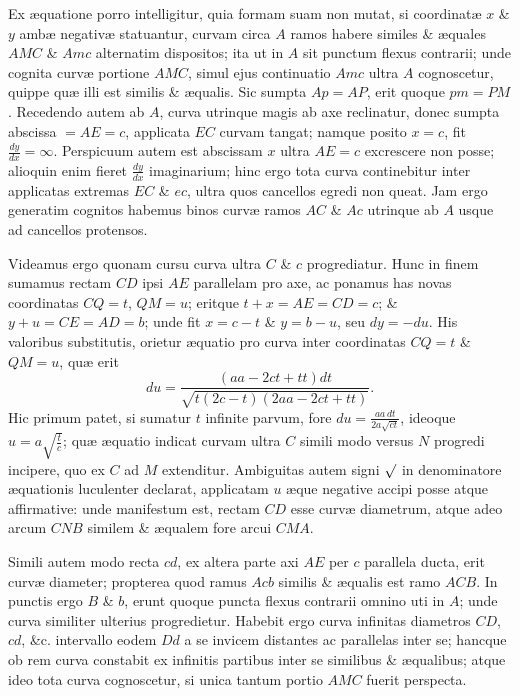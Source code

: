 Ex æquatione porro intelligitur, quia formam suam non mutat, si coordinatæ $x$ \& $y$ ambæ negativæ statuantur, curvam circa $A$ ramos habere similes \& æquales $AMC$ \& $Amc$ alternatim dispositos; ita ut in $A$ sit punctum flexus contrarii; unde cognita curvæ portione $AMC$, simul ejus continuatio $Amc$ ultra $A$ cognoscetur, quippe quæ illi est similis \& æqualis. Sic sumpta $Ap=AP$, erit quoque $pm=PM$. Recedendo autem ab $A$, curva utrinque magis ab axe reclinatur, donec sumpta abscissa $=AE=c$, applicata $EC$ curvam tangat; namque posito $x=c$, fit $\frac{dy}{dx}=\infty$. Perspicuum autem est abscissam $x$ ultra $AE=c$ excrescere non posse; alioquin enim fieret $\frac{dy}{dx}$ imaginarium; hinc ergo tota curva continebitur inter applicatas extremas $EC$ \& $ec$, ultra quos cancellos egredi non queat. Jam ergo generatim cognitos habemus binos curvæ ramos $AC$ \& $Ac$ utrinque ab $A$ usque ad cancellos protensos.

Videamus ergo quonam cursu curva ultra $C$ \& $c$ progrediatur. Hunc in finem sumamus rectam $CD$ ipsi $AE$ parallelam pro axe, ac ponamus has novas coordinatas $CQ=t$, $QM=u$; eritque $t+x=AE=CD=c$; \& $y+u=CE=AD=b$; unde fit $x=c-t$ \& $y=b-u$, seu $dy=-du$. His valoribus substitutis, orietur æquatio pro curva inter coordinatas $CQ=t$ \& $QM=u$, quæ erit
\[du=\frac{(aa-2ct+tt)dt}{\sqrt{t(2c-t)(2aa-2ct+tt)}}.\]
Hic primum patet, si sumatur $t$ infinite parvum, fore $du=\frac{aa\,dt}{2a\sqrt{ct}}$, ideoque $u=a\sqrt{\frac tc}$; quæ æquatio indicat curvam ultra $C$ simili modo versus $N$ progredi incipere, quo ex $C$ ad $M$ extenditur. Ambiguitas autem signi $\sqrt{\vphantom a}$ in denominatore æquationis luculenter declarat, applicatam $u$ æque negative accipi posse atque affirmative: unde manifestum est, rectam $CD$ esse curvæ diametrum, atque adeo arcum $CNB$ similem \& æqualem fore arcui $CMA$.

Simili autem modo recta $cd$, ex altera parte axi $AE$ per $c$ parallela ducta, erit curvæ diameter; propterea quod ramus $Acb$ similis \& æqualis est ramo $ACB$. In punctis ergo $B$ \& $b$, erunt quoque puncta flexus contrarii omnino uti in $A$; unde curva similiter ulterius progredietur. Habebit ergo curva infinitas diametros $CD$, $cd$, \&c. intervallo eodem $Dd$ a se invicem distantes ac parallelas inter se; hancque ob rem curva constabit ex infinitis partibus inter se similibus \& æqualibus; atque ideo tota curva cognoscetur, si unica tantum portio $AMC$ fuerit perspecta.

